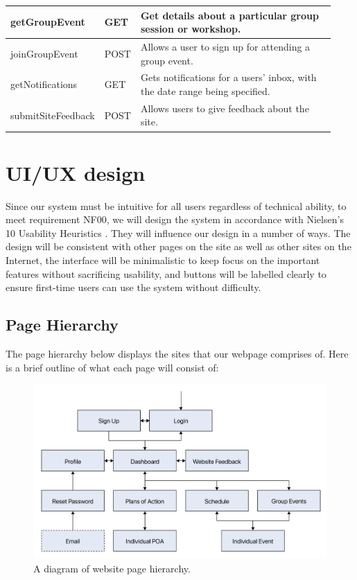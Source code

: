 \documentclass[10pt]{article}
\begin{document}
\begin{longtable}{|p{0.2\linewidth}|p{0.08\linewidth}|p{0.65\linewidth}|}
    getGroupEvent
    &
    GET
    &
    Get details about a particular group session or workshop.
    \\ \hline

    joinGroupEvent
    &
    POST
    &
    Allows a user to sign up for attending a group event.
    \\ \hline

    getNotifications
    &
    GET
    &
    Gets notifications for a users' inbox, with the date range being specified.
    \\ \hline

    submitSiteFeedback
    &
    POST
    &
    Allows users to give feedback about the site.
    \\ \hline



\end{longtable}




\section{UI/UX design}

Since our system must be intuitive for all users regardless of technical
ability, to meet requirement NF00, we will design the system in accordance with
Nielsen's 10 Usability Heuristics \cite{nielsen}. They will influence our design
in a number of ways. The design will be consistent with other pages on the site
as well as other sites on the Internet, the interface will be minimalistic to
keep focus on the important features without sacrificing usability, and buttons
will be labelled clearly to ensure first-time users can use the system without
difficulty.

\subsection{Page Hierarchy}
The page hierarchy below displays the sites that our webpage comprises of. Here
is a brief outline of what each page will consist of:

\begin{figure}[H]
    \centering
    \includegraphics[width=0.55 \textwidth]{Hierarchy}
    \caption{A diagram of website page hierarchy.}
    \label{fig:website_page_hierarchy}
\end{figure}
\end{document}
